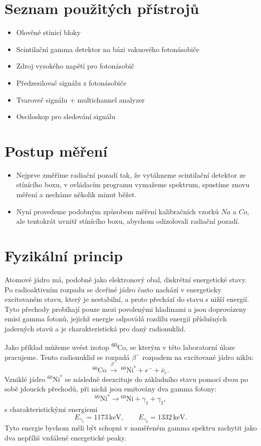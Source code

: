 \documentclass[a4paper,12pt]{article}
\begin{document}
\section{Seznam použitých přístrojů}
\begin{itemize}
    \item Olověné stínicí bloky
    \item Scintilační gamma detektor na bázi vakuového fotonásobiče
    \item Zdroj vysokého napětí pro fotonásobič
    \item Předzesilovač signálu z fotonásobiče
    \item Tvaroveč signálu + multichannel analyzer
    \item Osciloskop pro sledování signálu
\end{itemize}

\section{Postup měření}
\begin{itemize}
    \item Nejprve změříme radiační pozadí tak, že vytáhneme scintilační detektor ze stínícího boxu, v ovládacím programu vymažeme spektrum, spustíme znovu měření a necháme několik minut běžet.
    \item Nyní provedeme podobným způsobem měření kalibračních vzorků $Na$ a $Co$, ale tentokrát uvnitř stínícího boxu, abychom odizolovali radiační pozadí.
\end{itemize}

\section{Fyzikální princip}
Atomové jádro má, podobně jako elektronový obal, diskrétní energetické stavy. Po radioaktivním rozpadu se dceřiné jádro často nachází v energeticky excitovaném stavu, který je nestabilní, a proto přechází do stavu s nižší energií. Tyto přechody probíhají pouze mezi povolenými hladinami a jsou doprovázeny emisí gamma fotonů, jejichž energie odpovídá rozdílu energií příslušných jaderných stavů a je charakteristická pro daný radionuklid.

Jako příklad můžeme uvést izotop \textsuperscript{60}Co, se kterým v této laboratorní úloze pracujeme. Tento radionuklid se rozpadá $\beta^-$ rozpadem na excitované jádro niklu:
\[
{}^{60}\mathrm{Co} \;\xrightarrow{\beta^-}\; {}^{60}\mathrm{Ni}^* + e^- + \bar{\nu}_e.
\]
Vzniklé jádro ${}^{60}\mathrm{Ni}^*$ se následně deexcituje do základního stavu pomocí dvou po sobě jdoucích přechodů, při nichž jsou emitovány dva gamma fotony:
\[
{}^{60}\mathrm{Ni}^* \rightarrow {}^{60}\mathrm{Ni} + \gamma_1 + \gamma_2,
\]
s charakteristickými energiemi
\[
E_{\gamma_1} = 1173\,\mathrm{keV}, \qquad E_{\gamma_2} = 1332\,\mathrm{keV}.
\]
Tyto energie bychom měli být schopni v naměřeném gamma spektru zachytit jako dva nepříliš vzdálené energetické peaky.
\end{document}
